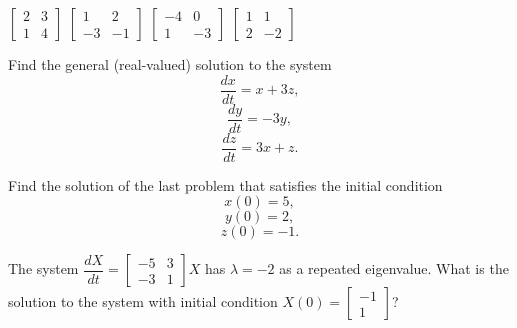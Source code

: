 \documentclass[11pt]{exam}
\begin{document}
\begin{questions}
\begin{oneparchoices}
\choice $\begin{bmatrix} 2 & 3 \\ 1 & 4 \end{bmatrix}$ \hspace{0.5in}
\choice $\begin{bmatrix} 1 & 2 \\ -3 & -1 \end{bmatrix}$ \hspace{0.5in}
\choice $\begin{bmatrix} -4 & 0 \\ 1 & -3 \end{bmatrix}$ \hspace{0.5in}
\choice $\begin{bmatrix} 1 & 1 \\ 2 & -2 \end{bmatrix}$ 
\end{oneparchoices}
\vfill


\question Find the general (real-valued) solution to the system 
$$\dfrac{dx}{dt} = x + 3z,$$
$$\dfrac{dy}{dt} = -3y,$$
$$\dfrac{dz}{dt} = 3x + z.$$
\vfill
\vfill

\question Find the solution of the last problem that satisfies the initial condition
$$x(0) = 5,$$
$$y(0) = 2,$$
$$z(0) = -1.$$
\vfill
\vfill

\question The system $\dfrac{dX}{dt} = \begin{bmatrix} -5 & 3 \\ -3 & 1 \end{bmatrix} X$ has $\lambda = -2$ as a repeated eigenvalue.  What is the solution to the system with initial condition $X(0) = \begin{bmatrix} -1 \\ 1 \end{bmatrix}$?
\vfill
\vfill


\end{questions}
\end{document}
